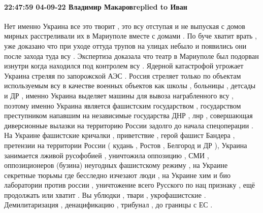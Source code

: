  
 
 
 
 

\paragraph{22:47:59 04-09-22 Владимир Макаровreplied to Иван}

Нет именно Украина все это творит , это всу отступая и не выпуская с домов
мирных расстреливали их в Мариуполе вместе с домами . По буче хватит врать ,
уже доказано что при уходе оттуда трупов на улицах небыло и появились они после
захода туда всу . Экспертиза доказала что театр в Мариуполе был подорван
изнутри когда находился под контролем всу . Ядерной катастрофой угрожает
Украина стреляя по запорожской АЭС . Россия стреляет только по объектам
используемым всу в качестве военных объектов как школы , больницы , детсады и
ДР , именно Украина выделяет машины для вывоза награбленного всу , поэтому
именно Украина является фашистским государством , государством преступником
напавшим на независимые государства ДНР , лнр , совершающая диверсионные
вылазки на территорию России задолго до начала спецоперации . На Украине
фашистские кричалки , приветствие , герой фашист Бандера , претензии на
территории России ( кудань , Ростов , Белгород и ДР ), Украина занимается
лживой русофобией , уничтожила оппозицию , СМИ , оппозиционеров (бузина)
неугодных фашистскому режиму , на Украине секретные тюрьмы где бесследно
изчезают люди , на Украине хим и био лаборатории против россии , уничтожение
всего Русского по нац признаку , ещё продолжать или хватит . Вы ублюдки , твари
, укрофашистские . Демилитаризация , денацификацию , трибунал , до границы с ЕС
.
